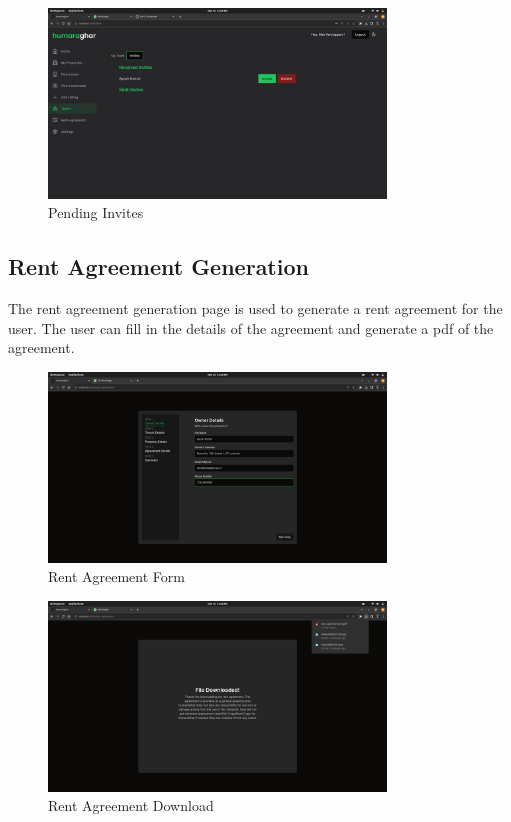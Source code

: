 \begin{figure}[h]
    \centering
    \includegraphics[width=0.8\textwidth]{Images/screenshots/invites.png}
    \caption{Pending Invites}
\end{figure}

\par\bigskip\bigskip
\subsection{Rent Agreement Generation}{
    The rent agreement generation page is used to generate a rent agreement for the user. The user can fill in the details of the agreement and generate a pdf of the agreement.
    \begin{figure}[h]
        \centering
        \includegraphics[width=0.8\textwidth]{Images/screenshots/agreementform.png}
        \caption{Rent Agreement Form}
    \end{figure}

    \begin{figure}[h]
        \centering
        \includegraphics[width=0.8\textwidth]{Images/screenshots/agreementdownload.png}
        \caption{Rent Agreement Download}
    \end{figure}

}


